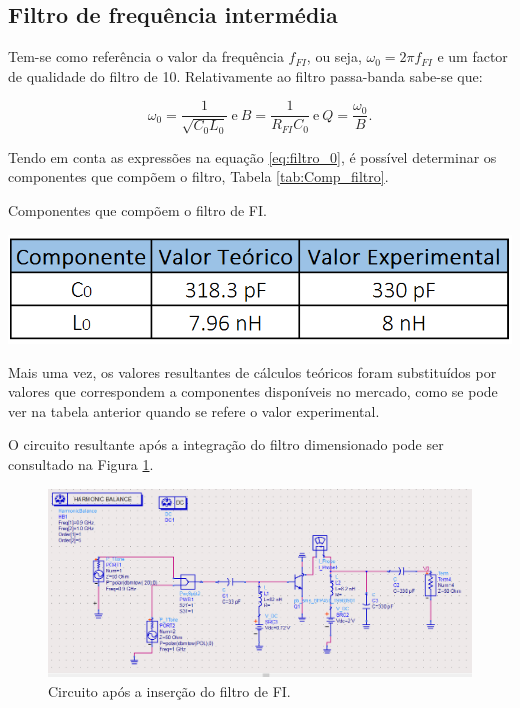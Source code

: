 \documentclass[11pt]{article}
\numberwithin{equation}{section}
\begin{document}
\subsection{Filtro de frequência intermédia}

Tem-se como referência o valor da frequência $ f_{FI} $, ou seja, $ \omega_{0}=2\pi f_{FI} $ e um factor de qualidade do filtro de 10. Relativamente ao filtro passa-banda sabe-se que:

\vspace{-3mm}
\begin{equation}
\omega_{0}=\frac{1}{\sqrt{C_{0}L_{0}}} ~ \text{e} ~ B=\frac{1}{R_{FI}C_{0}} ~ \text{e} ~ Q=\frac{\omega_{0}}{B}.
\label{eq:filtro_0}
\end{equation}

\vspace{1mm}
Tendo em conta as expressões na equação \ref{eq:filtro_0}, é possível determinar os componentes que compõem o filtro, Tabela \ref{tab:Comp_filtro}.

\begin{table}[h]
	\centering
	\caption{Componentes que compõem o filtro de FI.}
	\vspace{-1.5mm}
	\includegraphics[keepaspectratio=true, scale=0.40]{teoricas/filtro}
	\label{tab:Comp_filtro}
\end{table}

Mais uma vez, os valores resultantes de cálculos teóricos foram substituídos por valores que correspondem a componentes disponíveis no mercado, como se pode ver na tabela anterior quando se refere o valor experimental.

O circuito resultante após a integração do filtro dimensionado pode ser consultado na Figura \ref{fig:Circuito_1}.

\begin{figure}[h]
\centering
\includegraphics[keepaspectratio=true, scale=0.45]{exps/Circuito_1}
\vspace{-0.5em}
\caption{Circuito após a inserção do filtro de FI.}
\vspace{-0.8em}
\label{fig:Circuito_1}
\end{figure}
\end{document}
